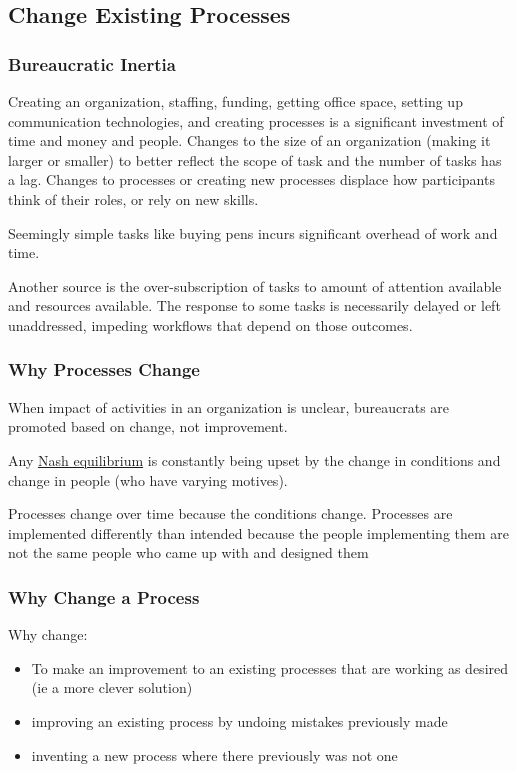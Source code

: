 \subsection{Change Existing Processes\label{sec:change_a_process}}

\subsubsection{Bureaucratic Inertia}

Creating an organization, staffing, funding, getting office space, setting up communication technologies, and creating processes is a significant investment of time and money and people. Changes to the size of an organization (making it larger or smaller) to better reflect the scope of task and the number of tasks has a lag. Changes to processes or creating new processes displace how participants think of their roles, or rely on new skills. 

Seemingly simple tasks like buying pens incurs significant overhead of work and time. 

Another source is the over-subscription of tasks to amount of attention available and resources available. The response to some tasks is necessarily delayed or left unaddressed, impeding workflows that depend on those outcomes. 



\subsubsection{Why Processes Change}


When impact of activities in an organization is unclear, bureaucrats are promoted based on change, not improvement.

Any \href{https://en.wikipedia.org/wiki/Nash_equilibrium}{Nash equilibrium} is constantly being upset by the change in conditions and change in people (who have varying motives).

Processes change over time because the conditions change. Processes are implemented differently than intended because the people implementing them are not the same people who came up with and designed them


\subsubsection{Why Change a Process}
Why change:
\begin{itemize}
    \item To make an improvement to an existing processes that are working as desired (ie a more clever solution)
    \item improving an existing process by undoing mistakes previously made
    \item inventing a new process where there previously was not one
\end{itemize}

